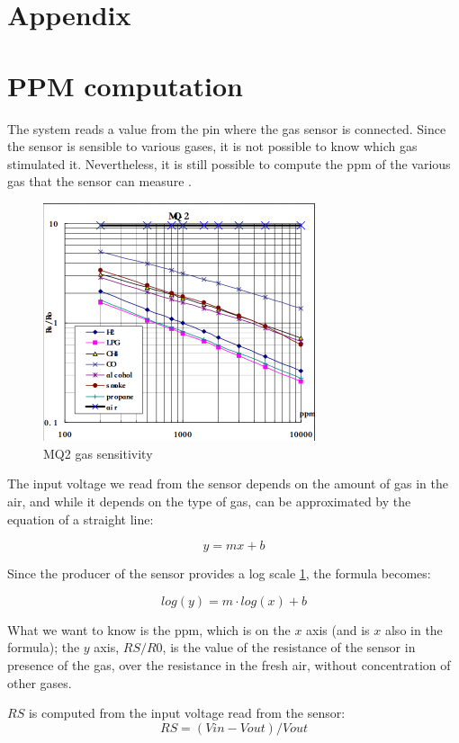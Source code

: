 \documentclass[]{article}
\begin{document}
\newpage 

\section*{Appendix}
\appendix
\section{PPM computation}\label{appendix}

The system reads a value from the pin where the gas sensor is connected. Since the sensor is sensible to various gases, it is not possible to know which gas stimulated it. Nevertheless, it is still possible to compute the ppm of the various gas that the sensor can measure \cite{tut:ppm}. 

\begin{figure}[!h]
	\centering
	\includegraphics[width=8cm]{img/Gas-Sensor-MQ2.png}
	\caption{\label{mq2table}MQ2 gas sensitivity}
\end{figure}

The input voltage we read from the sensor depends on the amount of gas in the air, and while it depends on the type of gas, can be approximated by the equation of a straight line:

$$ y = mx + b $$

Since the producer of the sensor provides a log scale \ref{mq2table}, the formula becomes:

$$   log(y) = m\cdot log(x) + b   $$

What we want to know is the ppm, which is on the $ x $ axis (and is $ x $ also in the formula); the $ y $ axis, $ RS/R0 $, is the value of the resistance of the sensor in presence of the gas, over the resistance in the fresh air, without concentration of other gases. 

$ RS $ is computed from the input voltage read from the sensor:
$$ RS = (Vin - Vout)/Vout $$
\end{document}
